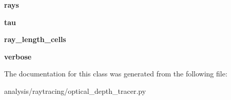 \begin{DoxyCompactItemize}
\item 
\hypertarget{classseren3_1_1analysis_1_1raytracing_1_1optical__depth__tracer_1_1OpticalDepthTracingProcess_a1c2f17bfd1be5117847fc31590071529}{
{\bfseries rays}}
\label{classseren3_1_1analysis_1_1raytracing_1_1optical__depth__tracer_1_1OpticalDepthTracingProcess_a1c2f17bfd1be5117847fc31590071529}

\item 
\hypertarget{classseren3_1_1analysis_1_1raytracing_1_1optical__depth__tracer_1_1OpticalDepthTracingProcess_a57992beb393c6188aeb62c061eb0626b}{
{\bfseries tau}}
\label{classseren3_1_1analysis_1_1raytracing_1_1optical__depth__tracer_1_1OpticalDepthTracingProcess_a57992beb393c6188aeb62c061eb0626b}

\item 
\hypertarget{classseren3_1_1analysis_1_1raytracing_1_1optical__depth__tracer_1_1OpticalDepthTracingProcess_a6db3999e57728b31491392f199064f66}{
{\bfseries ray\_\-length\_\-cells}}
\label{classseren3_1_1analysis_1_1raytracing_1_1optical__depth__tracer_1_1OpticalDepthTracingProcess_a6db3999e57728b31491392f199064f66}

\item 
\hypertarget{classseren3_1_1analysis_1_1raytracing_1_1optical__depth__tracer_1_1OpticalDepthTracingProcess_a27f220102deb66028b919aeca9017ccb}{
{\bfseries verbose}}
\label{classseren3_1_1analysis_1_1raytracing_1_1optical__depth__tracer_1_1OpticalDepthTracingProcess_a27f220102deb66028b919aeca9017ccb}

\end{DoxyCompactItemize}


The documentation for this class was generated from the following file:\begin{DoxyCompactItemize}
\item 
analysis/raytracing/optical\_\-depth\_\-tracer.py\end{DoxyCompactItemize}
